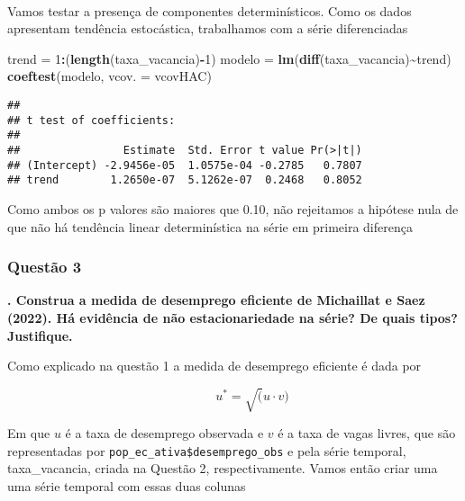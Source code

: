 \documentclass[
]{article}
\newenvironment{Shaded}{\begin{snugshade}}{\end{snugshade}}
\newcommand{\AttributeTok}[1]{\textcolor[rgb]{0.13,0.29,0.53}{#1}}
\newcommand{\DecValTok}[1]{\textcolor[rgb]{0.00,0.00,0.81}{#1}}
\newcommand{\FunctionTok}[1]{\textcolor[rgb]{0.13,0.29,0.53}{\textbf{#1}}}
\newcommand{\NormalTok}[1]{#1}
\newcommand{\OtherTok}[1]{\textcolor[rgb]{0.56,0.35,0.01}{#1}}
\newcommand{\SpecialCharTok}[1]{\textcolor[rgb]{0.81,0.36,0.00}{\textbf{#1}}}
\begin{document}
~

Vamos testar a presença de componentes determinísticos. Como os dados
apresentam tendência estocástica, trabalhamos com a série diferenciadas

\begin{Shaded}
\begin{Highlighting}[]
\NormalTok{ trend }\OtherTok{=} \DecValTok{1}\SpecialCharTok{:}\NormalTok{(}\FunctionTok{length}\NormalTok{(taxa\_vacancia)}\SpecialCharTok{{-}}\DecValTok{1}\NormalTok{)}
\NormalTok{modelo }\OtherTok{=} \FunctionTok{lm}\NormalTok{(}\FunctionTok{diff}\NormalTok{(taxa\_vacancia)}\SpecialCharTok{\textasciitilde{}}\NormalTok{trend)}
\FunctionTok{coeftest}\NormalTok{(modelo, }\AttributeTok{vcov. =}\NormalTok{ vcovHAC)}
\end{Highlighting}
\end{Shaded}

\begin{verbatim}
## 
## t test of coefficients:
## 
##                Estimate  Std. Error t value Pr(>|t|)
## (Intercept) -2.9456e-05  1.0575e-04 -0.2785   0.7807
## trend        1.2650e-07  5.1262e-07  0.2468   0.8052
\end{verbatim}

Como ambos os p valores são maiores que 0.10, não rejeitamos a hipótese
nula de que não há tendência linear determinística na série em primeira
diferença

\subsubsection{Questão 3}\label{questuxe3o-3}

\textbf{. Construa a medida de desemprego eficiente de Michaillat e Saez
(2022). Há evidência de não estacionariedade na série? De quais tipos?
Justifique.}

\begin{description}
\item[Como explicado na questão 1 a medida de desemprego eficiente é
dada por]
\[u^* = \sqrt(u \cdot v)\]
\end{description}

Em que \(u\) é a taxa de desemprego observada e \(v\) é a taxa de vagas
livres, que são representadas por
\texttt{pop\_ec\_ativa\$desemprego\_obs} e pela série temporal,
taxa\_vacancia, criada na Questão 2, respectivamente. Vamos então criar
uma uma série temporal com essas duas colunas

\begin{Shaded}
\end{Shaded}
\end{document}
